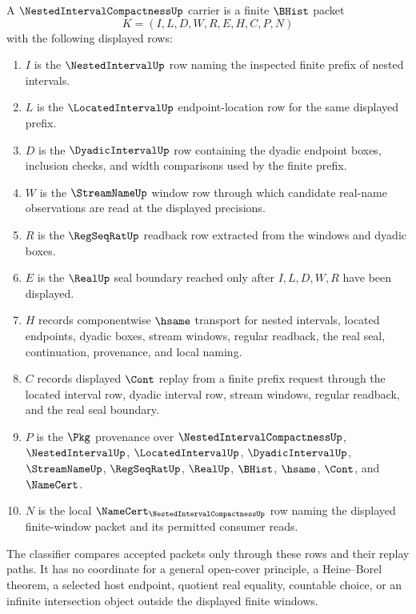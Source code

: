 \begin{definition}
\label{def:nested-interval-compactness-carrier}
A $\NestedIntervalCompactnessUp$ carrier is a finite $\BHist$ packet
$$
K=(I,L,D,W,R,E,H,C,P,N)
$$
with the following displayed rows:
\begin{enumerate}
\item $I$ is the $\NestedIntervalUp$ row naming the inspected finite prefix of nested intervals.
\item $L$ is the $\LocatedIntervalUp$ endpoint-location row for the same displayed prefix.
\item $D$ is the $\DyadicIntervalUp$ row containing the dyadic endpoint boxes, inclusion checks, and width comparisons used by the finite prefix.
\item $W$ is the $\StreamNameUp$ window row through which candidate real-name observations are read at the displayed precisions.
\item $R$ is the $\RegSeqRatUp$ readback row extracted from the windows and dyadic boxes.
\item $E$ is the $\RealUp$ seal boundary reached only after $I,L,D,W,R$ have been displayed.
\item $H$ records componentwise $\hsame$ transport for nested intervals, located endpoints, dyadic boxes, stream windows, regular readback, the real seal, continuation, provenance, and local naming.
\item $C$ records displayed $\Cont$ replay from a finite prefix request through the located interval row, dyadic interval row, stream windows, regular readback, and the real seal boundary.
\item $P$ is the $\Pkg$ provenance over $\NestedIntervalCompactnessUp$, $\NestedIntervalUp$, $\LocatedIntervalUp$, $\DyadicIntervalUp$, $\StreamNameUp$, $\RegSeqRatUp$, $\RealUp$, $\BHist$, $\hsame$, $\Cont$, and $\NameCert$.
\item $N$ is the local $\NameCert_{\NestedIntervalCompactnessUp}$ row naming the displayed finite-window packet and its permitted consumer reads.
\end{enumerate}
The classifier compares accepted packets only through these rows and their replay paths. It has no coordinate for a general open-cover principle, a Heine--Borel theorem, a selected host endpoint, quotient real equality, countable choice, or an infinite intersection object outside the displayed finite windows.
\end{definition}

